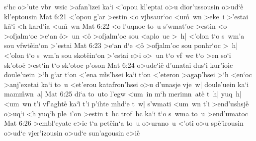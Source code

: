 s`hc
o>'ute
vbr~wsic
>afan'izei
ka`i
<'opou
kl'eptai
o>u
dior'ussousin
o>ud`e\r{}
kl'eptousin\bibvsend
\vs Mat 6:21
<'opou
g'ar
>estin
<o
vjhsaur`oc
<u\r{m}~wn
>eke~i
>'estai
k\r{a}`i
<h
kard'ia
<u\r{m}~wn\bibvsend
\vs Mat 6:22
<o
l'uqnoc
to~u
s'wmat'oc
>estin
<o
>ofjalm`oc
>e`an
\r{o}>~un
<o\r{}
>ofjalm'oc
sou
<aplo~uc
>~h|
<'olon
t`o
s~wm'a
sou
vfwt\r{e}in`on
>'estai\bibvsend
\vs Mat 6:23
>e`an
d`e
<o\r{}
>ofjalm'oc
sou
ponhr`oc
>~h|
<'olon
t`o
s~wm'a
sou
skot\r{e}in`on
>'estai
e>i
o>~un
t`o
vf~wc
t`o
>en
so`i
sk'otoc\r{}
>est`in
t`o
sk'otoc
p'oson\bibvsend
\vs Mat 6:24
o>ude`i\r{c}
d'unatai
dus`i
kur'ioic
doule'uein
>`h
g`ar
t`on
<'ena
m\r{i}s'hsei
ka`i
t`on
<'eteron
>agap'hsei
>`h
<en`oc
>anj'exetai
ka`i
to~u
<et'erou
katafron'hsei
o>u
d'unasje
vje~w|
doule'uein
ka`i
mam\r{m}wn~a|\bibvsend
{}
\vs Mat 6:25
di`a
to~uto
l'egw
<um~in
m`h
merimn~at\r{e}
t~h|
yuq~h|
<um~wn
t'i
vf'aght\r{e}
ka`i\r{}
t'i
p'ihte
mhd`e
t~w|
s'wmati
<um~wn
t'i
>end'ushsj\r{e}
o>uq`i
<h
yuq`h
ple~i'on
>estin
t~hc
trof~hc
ka`i
t`o
s~wma
to~u
>end'umatoc\bibvsend
\vs Mat 6:26
>embl'eyate
e>ic
t`a
pet\r{e}in`a
to~u
o>urano~u
<'oti
o>u
sp\r{e}'irousin
o>ud`e
vjer'izousin
o>ud`e
sun'agousin
e>i\r{c}
